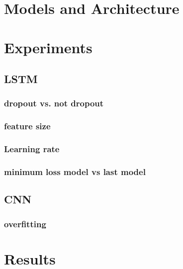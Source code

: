 \documentclass[a4paper]{article}
\begin{document}

\section{Models and Architecture}

\section{Experiments}
\subsection{LSTM}  %
\subsubsection{dropout vs. not dropout} %
\subsubsection{feature size} %
\subsubsection{Learning rate} %
\subsubsection{minimum loss model vs last model} %

\subsection{CNN} %
\subsubsection{overfitting} %

\section{Results}
\end{document}
